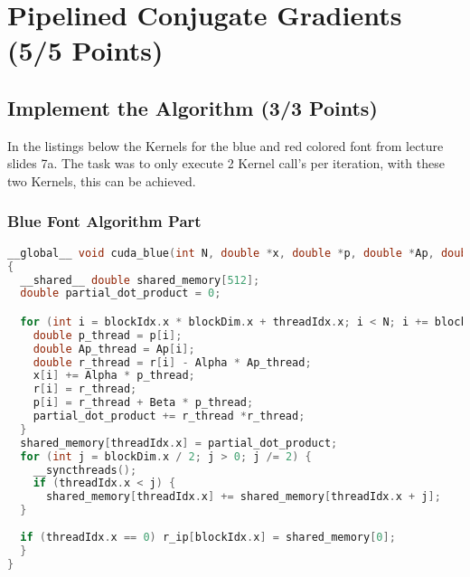 \section{Pipelined Conjugate Gradients (5/5 Points)}
\subsection{Implement the Algorithm (3/3 Points)}
In the listings below the Kernels for the blue and red colored font from lecture slides 7a.
The task was to only
execute 2 Kernel call's per iteration, with these two Kernels, this can be achieved.

\subsubsection{Blue Font Algorithm Part}
\begin{lstlisting}[language=C++, title=Kernel for Blue Font Algorithm Part]
__global__ void cuda_blue(int N, double *x, double *p, double *Ap, double *r, double *r_ip, double Alpha, double Beta)
{
  __shared__ double shared_memory[512];
  double partial_dot_product = 0;

  for (int i = blockIdx.x * blockDim.x + threadIdx.x; i < N; i += blockDim.x * gridDim.x){
    double p_thread = p[i];
    double Ap_thread = Ap[i];
    double r_thread = r[i] - Alpha * Ap_thread;
    x[i] += Alpha * p_thread;
    r[i] = r_thread;
    p[i] = r_thread + Beta * p_thread;
    partial_dot_product += r_thread *r_thread;
  }
  shared_memory[threadIdx.x] = partial_dot_product;
  for (int j = blockDim.x / 2; j > 0; j /= 2) {
    __syncthreads();
    if (threadIdx.x < j) {
      shared_memory[threadIdx.x] += shared_memory[threadIdx.x + j];
  }
  
  if (threadIdx.x == 0) r_ip[blockIdx.x] = shared_memory[0];
  }
}
\end{lstlisting}

\pagebreak

